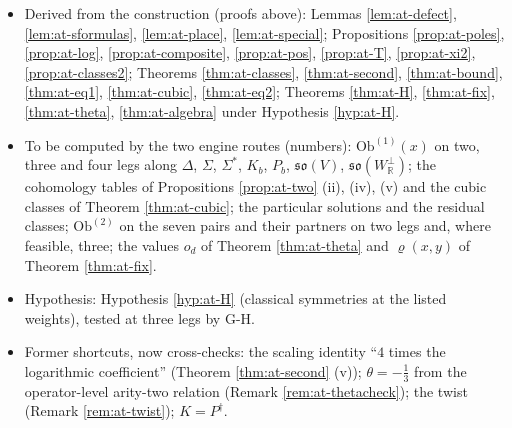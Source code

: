 \documentclass[11pt]{article}
\numberwithin{equation}{section}
\theoremstyle{plain}
\theoremstyle{definition}
\newcommand{\Ob}{\mathrm{Ob}}
\begin{document}
\begin{itemize}
\item Derived from the construction (proofs above): Lemmas \ref{lem:at-defect}, \ref{lem:at-sformulas}, \ref{lem:at-place}, \ref{lem:at-special}; Propositions \ref{prop:at-poles}, \ref{prop:at-log}, \ref{prop:at-composite}, \ref{prop:at-pos}, \ref{prop:at-T}, \ref{prop:at-xi2}, \ref{prop:at-classes2}; Theorems \ref{thm:at-classes}, \ref{thm:at-second}, \ref{thm:at-bound}, \ref{thm:at-eq1}, \ref{thm:at-cubic}, \ref{thm:at-eq2}; Theorems \ref{thm:at-H}, \ref{thm:at-fix}, \ref{thm:at-theta}, \ref{thm:at-algebra} under Hypothesis \ref{hyp:at-H}.
\item To be computed by the two engine routes (numbers): $\Ob^{(1)}(x)$ on two, three and four legs along $\Delta$, $\Sigma$, $\Sigma^*$, $K_b$, $P_b$, $\mathfrak{so}(V)$, $\mathfrak{so}(W^\perp_{\mathbb R})$; the cohomology tables of Propositions \ref{prop:at-two} (ii), (iv), (v) and the cubic classes of Theorem \ref{thm:at-cubic}; the particular solutions and the residual classes; $\Ob^{(2)}$ on the seven pairs and their partners on two legs and, where feasible, three; the values $o_d$ of Theorem \ref{thm:at-theta} and $\varrho(x,y)$ of Theorem \ref{thm:at-fix}.
\item Hypothesis: Hypothesis \ref{hyp:at-H} (classical symmetries at the listed weights), tested at three legs by G-H.
\item Former shortcuts, now cross-checks: the scaling identity ``$4$ times the logarithmic coefficient'' (Theorem \ref{thm:at-second} (v)); $\theta=-\tfrac13$ from the operator-level arity-two relation (Remark \ref{rem:at-thetacheck}); the twist (Remark \ref{rem:at-twist}); $K=P^\dagger$.
\end{itemize}
\end{document}
